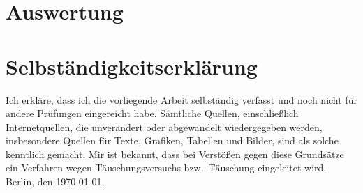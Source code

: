 \documentclass[draft=false,twoside,11pt]{scrreprt}
\begin{document}
\chapter{Auswertung}
\label{chap:review}


%
%


\printbibliography

\chapter*{Selbständigkeitserklärung}
Ich erkläre, dass ich die vorliegende Arbeit selbständig verfasst und noch nicht 
für andere Prüfungen eingereicht habe. Sämtliche Quellen, einschließlich
Internetquellen, die unverändert oder abgewandelt wiedergegeben werden,
insbesondere Quellen für Texte, Grafiken, Tabellen und Bilder, sind als solche
kenntlich gemacht. Mir ist bekannt, dass bei Verstößen gegen diese Grundsätze ein
Verfahren wegen Täuschungsversuchs bzw.\ Täuschung eingeleitet wird. 
\bigbreak
\noindent Berlin, den \today, 
\end{document}
